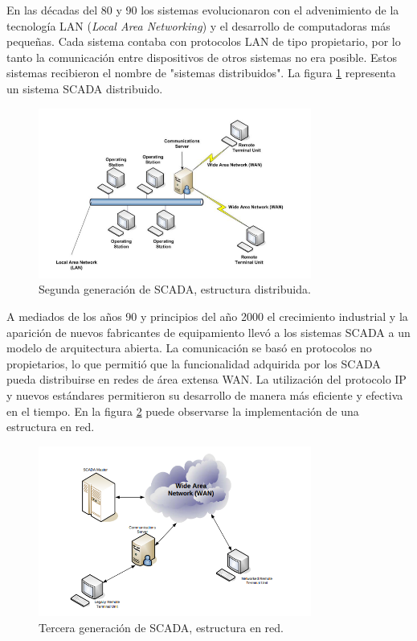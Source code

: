 En las décadas del 80 y 90 los sistemas evolucionaron con el advenimiento de la tecnología LAN (\textit{Local Area Networking}) y el desarrollo de computadoras más pequeñas. Cada sistema contaba con protocolos LAN de tipo propietario, por lo tanto  la comunicación entre dispositivos de otros sistemas no era posible. Estos sistemas recibieron el nombre de "sistemas distribuidos". La figura \ref{fig:SCDIS} representa un sistema SCADA distribuido.

\begin{figure}[htbp]
	\centering
	\includegraphics[width=0.8\textwidth]{./Figures/SCADA_DISTRIBUIDO.png}
	\caption{Segunda generación de SCADA, estructura distribuida.\citep{BOOK:2}}
	\label{fig:SCDIS}
\end{figure}

A mediados de los años 90 y principios del año 2000 el crecimiento industrial y la aparición de nuevos fabricantes de equipamiento llevó a los sistemas SCADA a un modelo de arquitectura abierta. La comunicación se basó en protocolos no propietarios, lo que permitió que la funcionalidad adquirida por los SCADA pueda distribuirse en redes de área extensa WAN. La utilización del protocolo IP y nuevos estándares permitieron su desarrollo de manera más eficiente y efectiva en el tiempo. En la figura \ref{fig:SCNET} puede observarse la implementación de una estructura en red.

\begin{figure}[htbp]
	\centering
	\includegraphics[width=0.8\textwidth]{./Figures/SCADA_NETWORKED.png}
	\caption{Tercera generación de SCADA, estructura en red.\citep{BOOK:2}}
	\label{fig:SCNET}
\end{figure}

